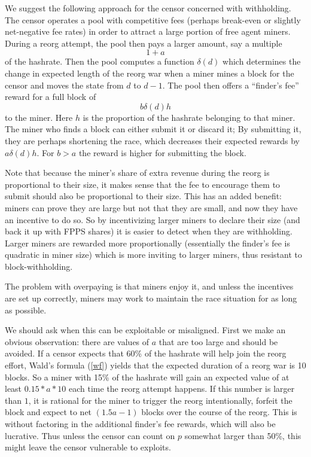 \documentclass{article}%
\begin{document}
We suggest the following approach for the censor concerned with withholding.
 The censor operates a pool with competitive fees (perhaps break-even or
slightly net-negative fee rates) in order to attract a large portion of free
agent miners.  During a reorg attempt, the pool then pays a larger amount,
say a multiple
\[
1+a
\]
of the hashrate.  Then the pool computes a function $\delta(d)$ which
determines the change in expected length of the reorg war when a miner mines a
block for the censor and moves the state from $d$ to $d-1.$  The pool then
offers a \textquotedblleft finder's fee'' reward for a full block of
\[
b\delta(d)h
\]
to the miner.  Here $h$ is the proportion of the hashrate belonging to that
miner.  The miner who finds a block can either submit it or discard it;  By
submitting it, they are perhaps shortening the race, which decreases their
expected rewards by $a\delta(d)h.$  For $b>a$ the reward is higher for
submitting the block.

Note that because the miner's share of extra revenue during the reorg is
proportional to their size, it makes sense that the fee to encourage them to
submit should also be proportional to their size.  This has an added
benefit: miners can prove they are large but not that they are small, and now they have an incentive to do so.
 So by incentivizing larger miners to declare their size (and back it up
with FPPS shares) it is easier to detect when they are withholding. Larger
miners are rewarded more proportionally (essentially the finder's fee is
quadratic in miner size) which is more inviting to larger miners, thus resistant to block-withholding.

The problem with overpaying is that miners enjoy it, and unless
the incentives are set up correctly, miners may work to maintain the race
situation for as long as possible.

We should ask when this can be exploitable or misaligned. First we make an
obvious observation: there are values of $a$ that are too large and should be
avoided. If a censor expects that 60\% of the hashrate will
help join the reorg effort, Wald's formula (\ref{wf}) yields that the expected duration
of a reorg war is 10 blocks.  So a miner with 15\% of the hashrate will gain
an expected value of at least $0.15\ast a\ast10$ each time the reorg attempt
happens. If this number is larger than $1$, it is rational for the miner to
trigger the reorg intentionally, forfeit the block and expect to net $(1.5a-1)$
blocks over the course of the reorg.  This is without factoring in the
additional finder's fee rewards,  which will also be lucrative.  Thus unless the
censor can count on $p$ somewhat larger than 50\%, this might leave the censor
vulnerable to exploits.
\end{document}
